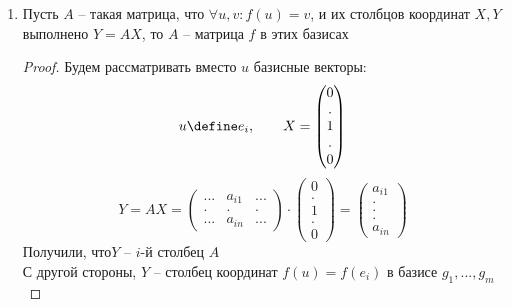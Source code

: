 \begin{lemma}
\begin{enumerate}
\begin{proof}
$$\begin{pmatrix}
                . & . & . \\
                a_{m1} & ... & a_{mn}
            \end{pmatrix} \cdot
            \begin{pmatrix}
            	x_1 \\
                . \\
                . \\
                . \\
                x_n
            \end{pmatrix} =
            \begin{pmatrix}
                a_{11}x_1 + ... + a_{1n}x_n \\
                \widedots[7em] \\
                a_{mi}x_1 + ... + a_{mn}x_n
            \end{pmatrix} $$
        \end{proof}
        \item Пусть $ A $ -- такая матрица, что $ \forall u, v : f(u) = v $, и их столбцов координат $ X, Y $ выполнено $ Y = AX $, то $ A $ -- матрица $ f $ в этих базисах
        \begin{proof}
        	Будем рассматривать вместо $ u $ базисные векторы:
			$$ u \define e_i, \qquad X =
			\begin{pmatrix}
				0 \\
				. \\
				1 \\
				. \\
				0
			\end{pmatrix} $$
			$$ Y = AX =
			\begin{pmatrix}
				... & a_{i1} & ... \\
				. & . & . \\
				... & a_{in} & ...
			\end{pmatrix} \cdot
			\begin{pmatrix}
				0 \\
				. \\
				1 \\
				. \\
				0
			\end{pmatrix} =
			\begin{pmatrix}
				a_{i1} \\
				. \\
				. \\
				. \\
				a_{in}
			\end{pmatrix} $$
			Получили, что$ Y $ -- $ i $-й столбец $ A $ \\
			С другой стороны, $ Y $ -- столбец координат $ f(u) = f(e_i) $ в базисе $ g_1, ..., g_m $
        \end{proof}
    \end{enumerate}
\end{lemma}

